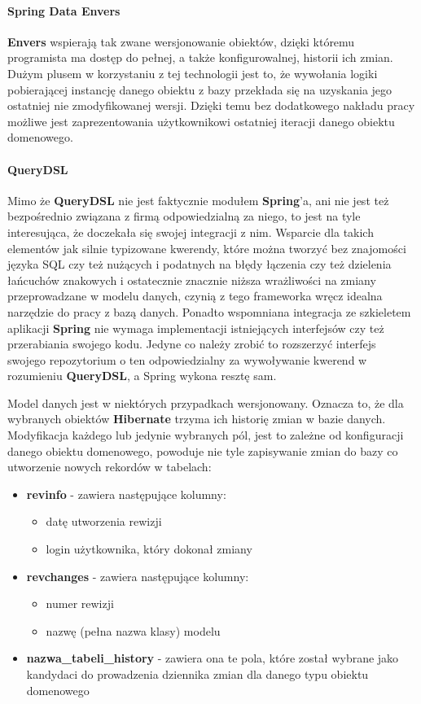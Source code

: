 			\paragraph{Spring Data Envers}
				\textbf{Envers} wspierają tak zwane wersjonowanie obiektów, dzięki któremu programista ma dostęp do pełnej, a także konfigurowalnej, 
				historii ich zmian. Dużym plusem w korzystaniu z tej technologii jest to, że wywołania logiki pobierającej instancję danego 
				obiektu z bazy przekłada się na uzyskania jego ostatniej nie zmodyfikowanej wersji. Dzięki temu bez dodatkowego nakładu pracy
				możliwe jest zaprezentowania użytkownikowi ostatniej iteracji danego obiektu domenowego. 
			\paragraph{QueryDSL}	
				Mimo że \textbf{QueryDSL} nie jest faktycznie modułem \textbf{Spring}'a, ani nie jest też bezpośrednio związana z firmą odpowiedzialną
				za niego, to jest na tyle interesująca, że doczekała się swojej integracji z nim. Wsparcie dla takich elementów jak silnie typizowane
				kwerendy, które można tworzyć bez znajomości języka SQL czy też nużących i podatnych na błędy łączenia czy też dzielenia łańcuchów
				znakowych i ostatecznie znacznie niższa wrażliwości na zmiany przeprowadzane w modelu danych, czynią z tego frameworka wręcz idealna narzędzie
				do pracy z bazą danych. Ponadto wspomniana integracja ze szkieletem aplikacji \textbf{Spring} nie wymaga implementacji istniejących
				interfejsów czy też przerabiania swojego kodu. Jedyne co należy zrobić to rozszerzyć interfejs swojego repozytorium o ten odpowiedzialny
				za wywoływanie kwerend w rozumieniu \textbf{QueryDSL}, a Spring wykona resztę sam.
				
			Model danych jest w niektórych przypadkach wersjonowany. Oznacza to, że dla wybranych obiektów \textbf{Hibernate} trzyma ich historię zmian
			w bazie danych. Modyfikacja każdego lub jedynie wybranych pól, jest to zależne od konfiguracji danego obiektu domenowego, powoduje nie tyle
			zapisywanie zmian do bazy co utworzenie nowych rekordów w tabelach:
			\begin{itemize}
				\item \textbf{revinfo} - zawiera następujące kolumny:
				\begin{itemize}
					\item datę utworzenia rewizji
					\item login użytkownika, który dokonał zmiany
				\end{itemize} 
				\item \textbf{revchanges} - zawiera następujące kolumny:
				\begin{itemize}
					\item numer rewizji
					\item nazwę (pełna nazwa klasy) modelu
				\end{itemize}
				\item \textbf{nazwa\_tabeli\_history} - zawiera ona te pola, które został wybrane jako kandydaci do prowadzenia 
				dziennika zmian dla danego typu obiektu domenowego
			\end{itemize}
			
